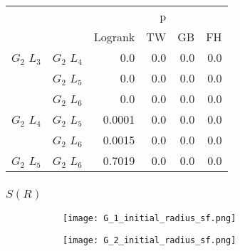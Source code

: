       \begin{table}
        \centering
        \begin{tabular}{llrrrr}
          \toprule
                       &             &         &  p &    &     \\
          \cmidrule{3-6}
                       &             & Logrank & TW & GB & FH  \\
          \midrule
          $G_2$ $L_3$  & $G_2$ $L_4$  &  0.0 &  0.0 &  0.0 &  0.0     \\
                       & $G_2$ $L_5$  & 0.0 & 0.0 & 0.0 & 0.0    \\
                       & $G_2$ $L_6$  & 0.0 & 0.0 & 0.0 & 0.0      \\
          $G_2$ $L_4$  & $G_2$ $L_5$  & 0.0001 & 0.0 & 0.0 & 0.0      \\
                       & $G_2$ $L_6$  & 0.0015 & 0.0 & 0.0 & 0.0       \\
          $G_2$ $L_5$   & $G_2$ $L_6$ & 0.7019 &  0.0 & 0.0 & 0.0      \\
          \bottomrule
        \end{tabular}
        \label{tab:g2_ingroup_tests_disp}
        \caption{}
      \end{table}




      

      \newpage
      

      \subsubsection{$S(R)$}
      
      \begin{figure}
        \centering
        
        \begin{subfigure}[b]{0.45\textwidth}
          \texttt{[image: G\_1\_initial\_radius\_sf.png]}
          \caption{}
          \label{fig:sf_g1_branch_radius}
        \end{subfigure}
        \hfill
        \begin{subfigure}[b]{0.45\textwidth}
          \texttt{[image: G\_2\_initial\_radius\_sf.png]}
          \caption{}
          \label{fig:sf_g2_branch_radius}
        \end{subfigure}

        \caption{}
        \label{fig:sf_branch_radius}

      \end{figure}

